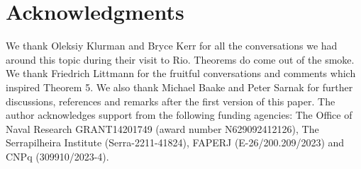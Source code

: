 \documentclass[a4paper,reqno,12pt]{amsart}
\newcommand{\1}{{\bf 1}}
\renewcommand{\1}{{\bo 1}}
\begin{document}
\section*{Acknowledgments}
We thank Oleksiy Klurman and Bryce Kerr for all the conversations we had around this topic during their visit to Rio. Theorems do come out of the smoke. We thank Friedrich Littmann for the fruitful conversations and comments which inspired Theorem 5. We also thank Michael Baake and Peter Sarnak for further discussions, references and remarks after the first version of this paper. The author acknowledges support from the following funding agencies: The Office of Naval Research GRANT14201749 (award number N629092412126), The Serrapilheira Institute (Serra-2211-41824), FAPERJ (E-26/200.209/2023) and CNPq (309910/2023-4).
\end{document}

